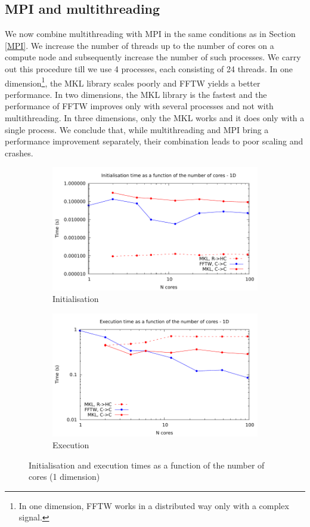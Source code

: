 \documentclass[12pt, a4paper]{article} \setlength{\textheight}{24cm}
\begin{document}
\subsection{MPI and multithreading}\label{MPIMULTH}
We now combine multithreading with MPI in the same conditions as in
Section \ref{MPI}. We increase the number of threads up to the number
of cores on a compute node and subsequently increase the number of
such processes. We carry out this procedure till we use 4 processes,
each consisting of 24 threads. In one dimension\footnote{In one
  dimension, FFTW works in a distributed way only with a complex
  signal.}, the MKL library scales poorly and FFTW yields a better
performance. In two dimensions, the MKL library is the fastest and the
performance of FFTW improves only with several processes and not with
multithreading. In three dimensions, only the MKL works and it does
only with a single process. We conclude that, while multithreading and
MPI bring a performance improvement separately, their combination
leads to poor scaling and crashes.
\begin{figure}[H]
  \captionsetup{width=0.8\linewidth}
  \centering
  \begin{subfigure}{.5\textwidth}
    \centering
    \includegraphics[width=.9\linewidth]{graphs/mpi-multh-init-1d.pdf}
    \caption{Initialisation}
    \label{1DMPIMULTHI}
  \end{subfigure}%
  \begin{subfigure}{.5\textwidth}
    \centering
    \includegraphics[width=.9\linewidth]{graphs/mpi-multh-exec-1d.pdf}
    \caption{Execution}
    \label{1DMPIMULTHE}
  \end{subfigure}
  \caption{Initialisation and execution times as a function of the
    number of cores (1 dimension)}
  \label{1DMPIMULTH}
\end{figure}
\end{document}
